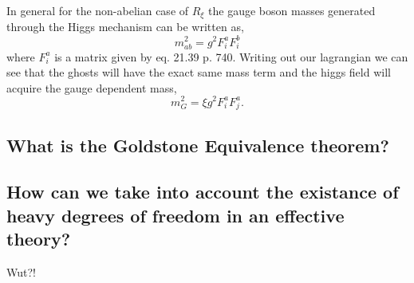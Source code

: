 \documentclass[paper=a4, fontsize=11pt]{scrartcl} %
\numberwithin{equation}{section} %
\numberwithin{figure}{section} %
\numberwithin{table}{section} %
\begin{document}
In general for the non-abelian case of $R_{\xi}$ the gauge boson masses generated through the Higgs mechanism can be written as,
\begin{equation}
m_{ab}^2 = g^2 F_{i}^a F_{i}^b
\end{equation}
where $F_{i}^a$ is a matrix given by eq. 21.39 p. 740. Writing out our lagrangian we can see that the ghosts will have the exact same mass term and the higgs field will acquire the gauge dependent mass,
\begin{equation}
m_G^2 = \xi g^2 F_i^a F_j^a.
\end{equation}

\subsection*{What is the Goldstone Equivalence theorem?}



\subsection*{How can we take into account the existance of heavy degrees of freedom in an effective theory?}
Wut?!
\end{document}
